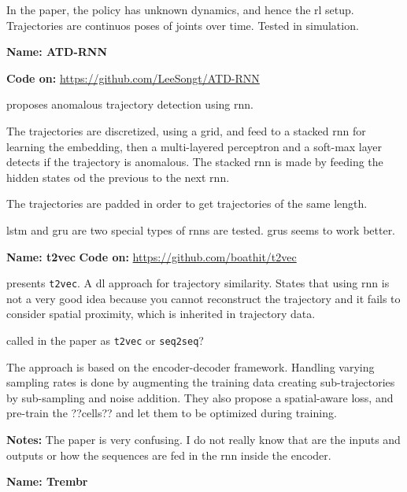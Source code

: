 In the paper, the policy has unknown dynamics, and hence the \gls{rl} setup. Trajectories are continuos poses of joints over time. Tested in simulation. 


\textbf{Name: ATD-RNN}

\textbf{Code on:} \url{https://github.com/LeeSongt/ATD-RNN}

\cite{song2018anomalous} proposes anomalous trajectory detection using \gls{rnn}.

The trajectories are discretized, using a grid, and feed to a stacked \gls{rnn} for learning the embedding, then a multi-layered perceptron and a soft-max layer detects if the trajectory is anomalous.
%
The stacked \gls{rnn} is made by feeding the hidden states od the previous to the next \gls{rnn}.

The trajectories are padded in order to get trajectories of the same length.

\gls{lstm} and \gls{gru} are two special types of \glspl{rnn} are tested. \glspl{gru} seems to work better.


\textbf{Name: t2vec}
\textbf{Code on:} \url{https://github.com/boathit/t2vec}

\cite{li2018deep} presents \texttt{t2vec}. A \gls{dl} approach for trajectory similarity. States that using \gls{rnn} is not a very good idea because you cannot reconstruct the trajectory and it fails to consider spatial proximity, which is inherited in trajectory data.

called in the paper as \texttt{t2vec} or \texttt{seq2seq}?

The approach is based on the encoder-decoder framework.
%
Handling varying sampling rates is done by augmenting the training data creating sub-trajectories by sub-sampling and noise addition. They also propose a spatial-aware loss, and pre-train the ??cells?? and let them to be optimized during training.

\textbf{Notes:} The paper is very confusing. I do not really know that are the inputs and outputs or how the sequences are fed in the \gls{rnn} inside the encoder.



\textbf{Name: Trembr}

